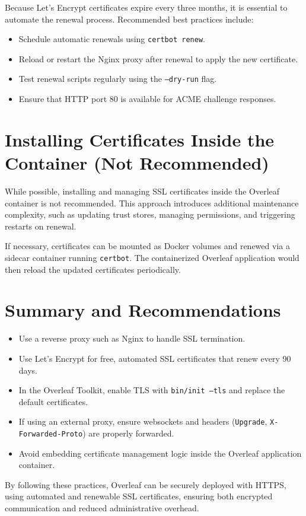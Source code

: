 Because Let’s Encrypt certificates expire every three months, it is essential to automate the renewal process. Recommended best practices include:
\begin{itemize}
    \item Schedule automatic renewals using \texttt{certbot renew}.
    \item Reload or restart the Nginx proxy after renewal to apply the new certificate.
    \item Test renewal scripts regularly using the \texttt{--dry-run} flag.
    \item Ensure that HTTP port 80 is available for ACME challenge responses.
\end{itemize}

\section{Installing Certificates Inside the Container (Not Recommended)}

While possible, installing and managing SSL certificates inside the Overleaf container is not recommended. This approach introduces additional maintenance complexity, such as updating trust stores, managing permissions, and triggering restarts on renewal.

If necessary, certificates can be mounted as Docker volumes and renewed via a sidecar container running \texttt{certbot}. The containerized Overleaf application would then reload the updated certificates periodically.

\section{Summary and Recommendations}

\begin{itemize}
    \item Use a reverse proxy such as Nginx to handle SSL termination.
    \item Use Let’s Encrypt for free, automated SSL certificates that renew every 90 days.
    \item In the Overleaf Toolkit, enable TLS with \texttt{bin/init --tls} and replace the default certificates.
    \item If using an external proxy, ensure websockets and headers (\texttt{Upgrade}, \texttt{X-Forwarded-Proto}) are properly forwarded.
    \item Avoid embedding certificate management logic inside the Overleaf application container.
\end{itemize}

By following these practices, Overleaf can be securely deployed with HTTPS, using automated and renewable SSL certificates, ensuring both encrypted communication and reduced administrative overhead.

